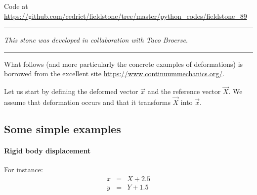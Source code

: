 

\begin{center}
Code at \url{https://github.com/cedrict/fieldstone/tree/master/python_codes/fieldstone_89}
\end{center}

\par\noindent\rule{\textwidth}{0.4pt}

{\sl This stone was developed in collaboration with Taco Broerse}. 

\par\noindent\rule{\textwidth}{0.4pt}


What follows (and more particularly the concrete examples of deformations) 
is borrowed from the excellent site \url{https://www.continuummechanics.org/}.

Let us start by defining the deformed vector $\vec{x}$ and the reference vector $\vec{X}$.
We assume that deformation occurs and that it transforms $\vec{X}$ into $\vec{x}$.



\subsection*{Some simple examples}

\paragraph{Rigid body displacement} For instance:  
\begin{eqnarray}
x &=& X + 2.5 \\
y &=& Y + 1.5 
\end{eqnarray}


\begin{center}
\end{center}


